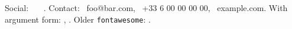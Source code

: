 \documentclass{article}
\begin{document}
Social: \faGithub\ \faLinkedin\ \faTwitter\ \faInstagram.
Contact: \faEnvelope\ foo@bar.com, \faPhone\ +33 6 00 00 00 00, \faGlobe\ example.com.
With argument form: , .
Older \texttt{fontawesome}: .
\end{document}
